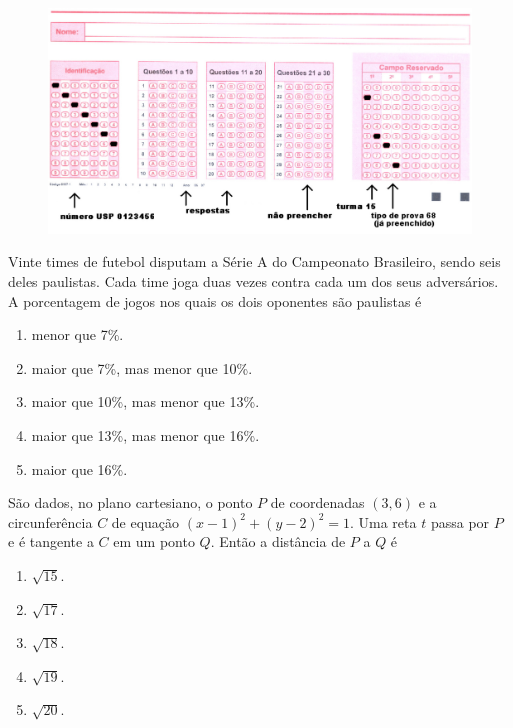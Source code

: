 \documentclass[twocolumn,landscape]{amsart}
\begin{document}
\begin{figure}[h!]
  \centering
  \includegraphics[width=12cm]{front-gabarito.jpg} %
\end{figure}

\thispagestyle{empty}

\cleardoublepage

\begin{questao}
  Vinte times de futebol disputam a Série A do Campeonato Brasileiro,
  sendo seis deles paulistas.  Cada time joga duas vezes contra cada um
  dos seus adversários. A porcentagem de jogos nos quais os dois
  oponentes são paulistas é
  \begin{enumerate}[\bf a.]
    \item menor que 7\%.
    \item maior que 7\%, mas menor que 10\%. %
    \item maior que 10\%, mas menor que 13\%.
    \item maior que 13\%, mas menor que 16\%.
    \item maior que 16\%.
  \end{enumerate}
\end{questao}
\clearpage

\begin{questao}
  São dados, no plano cartesiano, o ponto $P$ de coordenadas $(3,6)$ e a
  circunferência $C$ de equação $(x-1)^2+(y-2)^2=1$. Uma reta $t$ passa
  por $P$ e é tangente a $C$ em um ponto $Q$. Então a distância de $P$ a
  $Q$ é

  \begin{enumerate}[\bf a.]
    \item $\sqrt{15}$.
    \item $\sqrt{17}$.
    \item $\sqrt{18}$.
    \item $\sqrt{19}$. %
    \item $\sqrt{20}$.
  \end{enumerate}
\end{questao}
\clearpage
\end{document}
